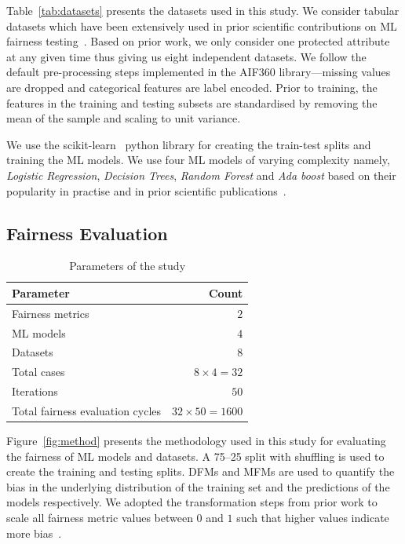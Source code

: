 \documentclass[sigconf,review,anonymous]{acmart}
\begin{document}
Table \ref{tab:datasets} presents the datasets used in this study. We
consider tabular datasets which have been extensively used in prior
scientific contributions on ML fairness
testing \cite{zhang2021ignorance,biswas2020machine,biswas2021fair,chen2022fairness}. Based
on prior work, we only consider one protected attribute at any given
time thus giving us eight independent datasets. We follow the default
pre-processing steps implemented in the AIF360 library---missing
values are dropped and categorical features are label encoded. Prior
to training, the features in the training and testing subsets are
standardised by removing the mean of the sample and scaling to unit
variance.

We use the scikit-learn \cite{pedregosa2011scikit} python library for
creating the train-test splits and training the ML models. We use four
ML models of varying complexity namely, \emph{Logistic Regression},
\emph{Decision Trees}, \emph{Random Forest} and \emph{Ada boost} based
on their popularity in practise and in prior scientific
publications \cite{zhang2021ignorance,biswas2021fair,biswas2020machine}.

\subsection{Fairness Evaluation}\label{sec:method-fair-eval}

\begin{table}
  \centering
  \caption{Parameters of the study}
  \begin{tabular}{l r}
    \toprule
    \textbf{Parameter} & \textbf{Count}\\
    \midrule
    Fairness metrics & $2$\\
    ML models & $4$\\
    Datasets & $8$\\
    Total cases & $8\times4=32$\\
    Iterations & $50$\\
    Total fairness evaluation cycles & $32\times50=1600$\\
    \bottomrule
  \end{tabular}
  \label{tab:parameters}
\end{table}

Figure \ref{fig:method} presents the methodology used in this study
for evaluating the fairness of ML models and datasets. A 75--25 split
with shuffling is used to create the training and testing splits. DFMs
and MFMs are used to quantify the bias in the underlying distribution
of the training set and the predictions of the models respectively. We
adopted the transformation steps from prior work to scale all fairness
metric values between $0$ and $1$ such that higher values indicate
more bias \cite{zhang2021ignorance,hort2021fairea}.
\end{document}

